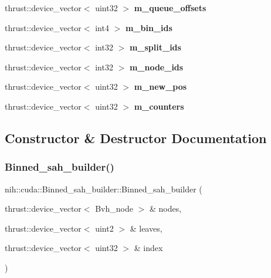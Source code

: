 \begin{DoxyCompactItemize}
thrust\+::device\+\_\+vector$<$ uint32 $>$ {\bfseries m\+\_\+queue\+\_\+offsets}
\item 
\mbox{\label{structnih_1_1cuda_1_1_binned__sah__builder_a949b3b856a6e0fb81b5be169768e3b68}} 
thrust\+::device\+\_\+vector$<$ int4 $>$ {\bfseries m\+\_\+bin\+\_\+ids}
\item 
\mbox{\label{structnih_1_1cuda_1_1_binned__sah__builder_aa6475cf583a04104307b4fb62d13c738}} 
thrust\+::device\+\_\+vector$<$ int32 $>$ {\bfseries m\+\_\+split\+\_\+ids}
\item 
\mbox{\label{structnih_1_1cuda_1_1_binned__sah__builder_a0ee10cc2841c1cce7250db6c3d25f4d7}} 
thrust\+::device\+\_\+vector$<$ int32 $>$ {\bfseries m\+\_\+node\+\_\+ids}
\item 
\mbox{\label{structnih_1_1cuda_1_1_binned__sah__builder_a64720f7846a23e8b928bf893a7c7542d}} 
thrust\+::device\+\_\+vector$<$ uint32 $>$ {\bfseries m\+\_\+new\+\_\+pos}
\item 
\mbox{\label{structnih_1_1cuda_1_1_binned__sah__builder_accf758923f191a318793f5f46d0895d2}} 
thrust\+::device\+\_\+vector$<$ uint32 $>$ {\bfseries m\+\_\+counters}
\end{DoxyCompactItemize}


\subsection{Constructor \& Destructor Documentation}
\mbox{\label{structnih_1_1cuda_1_1_binned__sah__builder_aa63d7a78d801ae4bf48f61cc84733de8}} 
\subsubsection{\texorpdfstring{Binned\+\_\+sah\+\_\+builder()}{Binned\_sah\_builder()}}
{\footnotesize\ttfamily nih\+::cuda\+::\+Binned\+\_\+sah\+\_\+builder\+::\+Binned\+\_\+sah\+\_\+builder (\begin{DoxyParamCaption}\item[{thrust\+::device\+\_\+vector$<$ Bvh\+\_\+node $>$ \&}]{nodes,  }\item[{thrust\+::device\+\_\+vector$<$ uint2 $>$ \&}]{leaves,  }\item[{thrust\+::device\+\_\+vector$<$ uint32 $>$ \&}]{index }\end{DoxyParamCaption})\hspace{0.3cm}{\ttfamily [inline]}}

